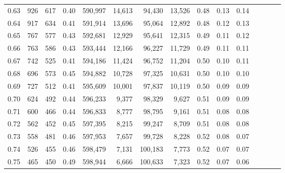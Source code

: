 \begin{tabular}{rrrcrrrrrrrrrrr}
0.63 &     926 &    617 &                                       0.40 &  590,997 &   14,613 &   94,430 &   13,526 &  0.48 &  0.13 &                         0.14 \\
0.64 &     917 &    634 &                                       0.41 &  591,914 &   13,696 &   95,064 &   12,892 &  0.48 &  0.12 &                         0.13 \\
0.65 &     767 &    577 &                                       0.43 &  592,681 &   12,929 &   95,641 &   12,315 &  0.49 &  0.11 &                         0.12 \\
0.66 &     763 &    586 &                                       0.43 &  593,444 &   12,166 &   96,227 &   11,729 &  0.49 &  0.11 &                         0.11 \\
0.67 &     742 &    525 &                                       0.41 &  594,186 &   11,424 &   96,752 &   11,204 &  0.50 &  0.10 &                         0.11 \\
0.68 &     696 &    573 &                                       0.45 &  594,882 &   10,728 &   97,325 &   10,631 &  0.50 &  0.10 &                         0.10 \\
0.69 &     727 &    512 &                                       0.41 &  595,609 &   10,001 &   97,837 &   10,119 &  0.50 &  0.09 &                         0.09 \\
0.70 &     624 &    492 &                                       0.44 &  596,233 &    9,377 &   98,329 &    9,627 &  0.51 &  0.09 &                         0.09 \\
0.71 &     600 &    466 &                                       0.44 &  596,833 &    8,777 &   98,795 &    9,161 &  0.51 &  0.08 &                         0.08 \\
0.72 &     562 &    452 &                                       0.45 &  597,395 &    8,215 &   99,247 &    8,709 &  0.51 &  0.08 &                         0.08 \\
0.73 &     558 &    481 &                                       0.46 &  597,953 &    7,657 &   99,728 &    8,228 &  0.52 &  0.08 &                         0.07 \\
0.74 &     526 &    455 &                                       0.46 &  598,479 &    7,131 &  100,183 &    7,773 &  0.52 &  0.07 &                         0.07 \\
0.75 &     465 &    450 &                                       0.49 &  598,944 &    6,666 &  100,633 &    7,323 &  0.52 &  0.07 &                         0.06 \\

\end{tabular}
